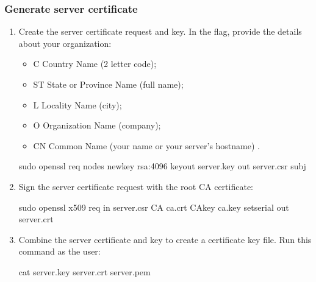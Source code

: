 \documentclass[letterpaper,10pt,english]{sphinxmanual}
\begin{document}
\subsubsection{Generate server certificate}
\label{\detokenize{x509-ldap:generate-server-certificate}}\begin{enumerate}
%
\item {} 
\sphinxAtStartPar
Create the server certificate request and key. In the  flag, provide the details about your organization:
\begin{itemize}
\item {} 
\sphinxAtStartPar
C \sphinxhyphen{} Country Name (2 letter code);

\item {} 
\sphinxAtStartPar
ST \sphinxhyphen{} State or Province Name (full name);

\item {} 
\sphinxAtStartPar
L \sphinxhyphen{} Locality Name (city);

\item {} 
\sphinxAtStartPar
O \sphinxhyphen{} Organization Name (company);

\item {} 
\sphinxAtStartPar
CN \sphinxhyphen{} Common Name (your name or your server’s hostname) .

\end{itemize}

\begin{sphinxVerbatim}[commandchars=\\\{\}]
\PYGZdl{} sudo openssl req \PYGZhy{}nodes \PYGZhy{}newkey rsa:4096 \PYGZhy{}keyout server.key \PYGZhy{}out server.csr \PYGZhy{}subj 
\end{sphinxVerbatim}

\item {} 
\sphinxAtStartPar
Sign the server certificate request with the root CA certificate:

\begin{sphinxVerbatim}[commandchars=\\\{\}]
\PYGZdl{} sudo openssl x509 \PYGZhy{}req \PYGZhy{}in server.csr \PYGZhy{}CA ca.crt \PYGZhy{}CAkey ca.key \PYGZhy{}set\PYGZus{}serial  \PYGZhy{}out server.crt
\end{sphinxVerbatim}

\item {} 
\sphinxAtStartPar
Combine the server certificate and key to create a certificate key file. Run this command as the  user:

\begin{sphinxVerbatim}[commandchars=\\\{\}]
\PYGZdl{} cat server.key server.crt \PYGZgt{} server.pem
\end{sphinxVerbatim}

\end{enumerate}
\end{document}

